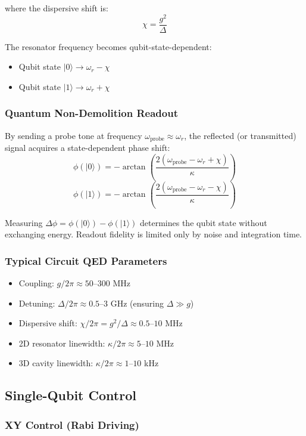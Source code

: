 \documentclass{article}
\begin{document}
where the dispersive shift is:
$$\chi = \frac{g^2}{\Delta}$$

The resonator frequency becomes qubit-state-dependent:
\begin{itemize}
    \item Qubit state $|0\rangle \to \omega_r - \chi$
    \item Qubit state $|1\rangle \to \omega_r + \chi$
\end{itemize}

\subsubsection*{Quantum Non-Demolition Readout}

By sending a probe tone at frequency $\omega_{\text{probe}} \approx \omega_r$, the reflected (or transmitted) signal acquires a state-dependent phase shift:
$$\phi(|0\rangle) = -\arctan\left(\frac{2(\omega_{\text{probe}} - \omega_r + \chi)}{\kappa}\right)$$
$$\phi(|1\rangle) = -\arctan\left(\frac{2(\omega_{\text{probe}} - \omega_r - \chi)}{\kappa}\right)$$

Measuring $\Delta\phi = \phi(|0\rangle) - \phi(|1\rangle)$ determines the qubit state without exchanging energy. Readout fidelity is limited only by noise and integration time.

\subsubsection*{Typical Circuit QED Parameters}

\begin{itemize}
    \item Coupling: $g/2\pi \approx 50$--$300$ MHz
    \item Detuning: $\Delta/2\pi \approx 0.5$--$3$ GHz (ensuring $\Delta \gg g$)
    \item Dispersive shift: $\chi/2\pi = g^2/\Delta \approx 0.5$--$10$ MHz
    \item 2D resonator linewidth: $\kappa/2\pi \approx 5$--$10$ MHz
    \item 3D cavity linewidth: $\kappa/2\pi \approx 1$--$10$ kHz
\end{itemize}

\subsection{Single-Qubit Control}

\subsubsection*{XY Control (Rabi Driving)}
\end{document}
